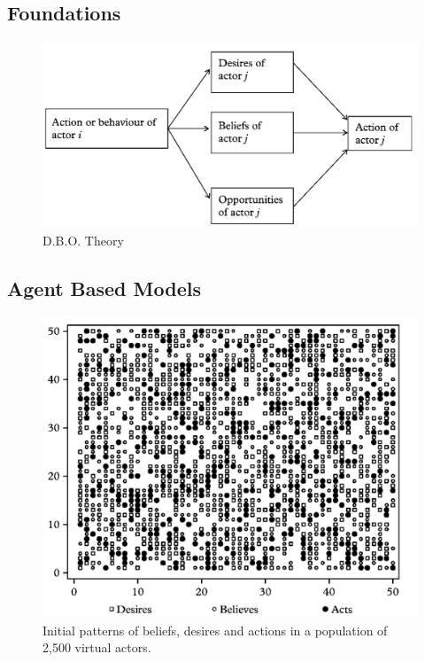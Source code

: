 \documentclass[11pt]{article}
\begin{document}
\subsection*{Foundations}
\label{sec:orgdc4d237}
\begin{figure}[htbp]
\centering
\includegraphics[width=.9\linewidth]{dbo.png}
\caption{D.B.O. Theory}
\end{figure}


\subsection*{Agent Based Models}
\label{sec:org7720a8c}

\begin{figure}[htbp]
\centering
\includegraphics[width=.9\linewidth]{abm.png}
\caption{Initial patterns of beliefs, desires and actions in a population of 2,500 virtual actors.}
\end{figure}
\end{document}

